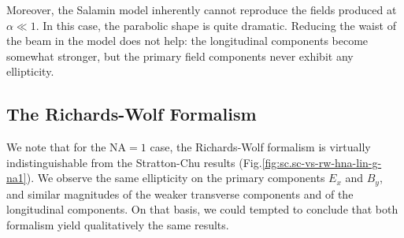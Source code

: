 \documentclass[11pt,SymmetricalJury]{inrsthesis/inrsthesis}
\begin{document}
Moreover, the Salamin model inherently cannot reproduce the fields produced at
$\alpha\ll1$. In this case, the parabolic shape is quite dramatic. Reducing the
waist of the beam in the model does not help: the longitudinal components become
somewhat stronger, but the primary field components never exhibit any
ellipticity.


\subsection{The Richards-Wolf Formalism}

We note that for the $\text{NA}=1$ case, the Richards-Wolf formalism is
virtually indistinguishable from the Stratton-Chu results
(Fig.\ref{fig:sc.sc-vs-rw-hna-lin-g-na1}). We observe the same ellipticity on
the primary components $E_x$ and $B_y$, and similar magnitudes of the weaker
transverse components and of the longitudinal components. On that basis, we
could tempted to conclude that both formalism yield qualitatively the same
results.
\end{document}
